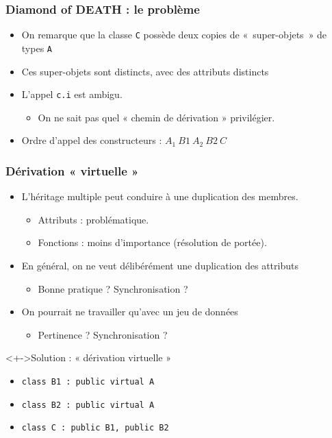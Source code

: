 \begin{frame}
\frametitle{Diamond of DEATH : le problème}
\begin{itemize}
 \item On remarque que la classe \texttt{C} possède deux copies de «~super-objets~» de types \texttt{A}
 \item Ces super-objets sont distincts, avec des attributs distincts
\end{itemize}
\begin{center}
\end{center}
\begin{itemize}
 \item L'appel \texttt{c.i} est ambigu.
	\begin{itemize}
	 \item On ne sait pas quel « chemin de dérivation » privilégier.
	\end{itemize}
 \item Ordre d'appel des constructeurs : $A_1~B1~A_2~B2~C$
\end{itemize}
\end{frame}

\begin{frame}
\frametitle{Dérivation « virtuelle »}
\begin{itemize}[<+->]
\item L'héritage multiple peut conduire à une duplication des membres.
	\begin{itemize}
	\item Attributs : problématique.
	\item Fonctions : moins d'importance (résolution de portée).
	\end{itemize}
\item En général, on ne veut délibérément une duplication des attributs
	\begin{itemize}
	\item Bonne pratique ? Synchronisation ?
	\end{itemize}
\item On pourrait ne travailler qu'avec un jeu de données
	\begin{itemize}
	\item Pertinence ? Synchronisation ?
	\end{itemize}
\end{itemize}
\begin{exampleblock}<+->{Solution : « dérivation virtuelle »}
	\begin{itemize}
	\item \lstinline|class B1 : public virtual A|
	\item \lstinline|class B2 : public virtual A|
	\item \lstinline|class C : public B1, public B2|
	\end{itemize}
\end{exampleblock}
\end{frame}

